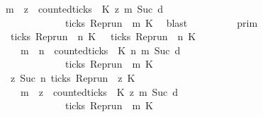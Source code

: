 \begin{isabellebody}
\ \ \ \ \ \ \ \ \ \ \ \ \ \ \ \ \ {\isacharparenleft}{\isasymforall}m\ {\isasymge}\ z{\isachardot}\ \ counted{\isacharunderscore}ticks\ {\isasymrho}\ K\ z\ m\ {\isacharparenleft}Suc\ d{\isacharparenright}\isanewline
\ \ \ \ \ \ \ \ \ \ \ \ \ \ \ \ \ \ \ \ \ \ \ \ \ \ \ \ {\isasymlongrightarrow}\ ticks\ {\isacharparenleft}{\isacharparenleft}Rep{\isacharunderscore}run\ {\isasymrho}{\isacharparenright}\ m\ K\ \isamarkupfalse%
\ blast\isanewline
\ \ \isamarkupfalse%
\ \isamarkupfalse%
\ {\isacartoucheopen}{\isachardot}{\isachardot}{\isachardot}\ {\isacharequal}\ {\isasymlbrakk}{\isasymlbrakk}\ {\isasymGamma}\ {\isasymrbrakk}{\isasymrbrakk}\isactrlsub p\isactrlsub r\isactrlsub i\isactrlsub m\ \isanewline
\ \ \ \ \ \ \ \ \ \ \ \ \ \ \ \ {\isasyminter}\ {\isacharparenleft}{\isacharbraceleft}{\isasymrho}{\isachardot}\ {\isasymnot}ticks\ {\isacharparenleft}{\isacharparenleft}Rep{\isacharunderscore}run\ {\isasymrho}{\isacharparenright}\ n\ K\ {\isasymunion}\ {\isacharbraceleft}{\isasymrho}{\isachardot}\ ticks\ {\isacharparenleft}{\isacharparenleft}Rep{\isacharunderscore}run\ {\isasymrho}{\isacharparenright}\ n\ K\ {\isasymand}\isanewline
\ \ \ \ \ \ \ \ \ \ \ \ \ \ \ \ \ \ \ \ {\isacharparenleft}{\isasymforall}m\ {\isasymge}\ n{\isachardot}\ \ counted{\isacharunderscore}ticks\ {\isasymrho}\ K\ n\ m\ {\isacharparenleft}Suc\ d{\isacharparenright}\isanewline
\ \ \ \ \ \ \ \ \ \ \ \ \ \ \ \ \ \ \ \ \ \ \ \ \ \ \ \ {\isasymlongrightarrow}\ ticks\ {\isacharparenleft}{\isacharparenleft}Rep{\isacharunderscore}run\ {\isasymrho}{\isacharparenright}\ m\ K\ {\isacharbraceright}{\isacharparenright}\isanewline
\ \ \ \ \ \ \ \ \ \ \ \ \ \ \ \ {\isasyminter}\ {\isacharbraceleft}{\isasymrho}{\isachardot}\ {\isasymforall}z{\isasymge}\ Suc\ n{\isachardot}\ ticks\ {\isacharparenleft}{\isacharparenleft}Rep{\isacharunderscore}run\ {\isasymrho}{\isacharparenright}\ z\ K\ {\isasymlongrightarrow}\isanewline
\ \ \ \ \ \ \ \ \ \ \ \ \ \ \ \ \ \ \ \ {\isacharparenleft}{\isasymforall}m\ {\isasymge}\ z{\isachardot}\ \ counted{\isacharunderscore}ticks\ {\isasymrho}\ K\ z\ m\ {\isacharparenleft}Suc\ d{\isacharparenright}\isanewline
\ \ \ \ \ \ \ \ \ \ \ \ \ \ \ \ \ \ \ \ \ \ \ \ \ \ \ \ {\isasymlongrightarrow}\ ticks\ {\isacharparenleft}{\isacharparenleft}Rep{\isacharunderscore}run\ {\isasymrho}{\isacharparenright}\ m\ K\ {\isacharbraceright}\isanewline

\end{isabellebody}
